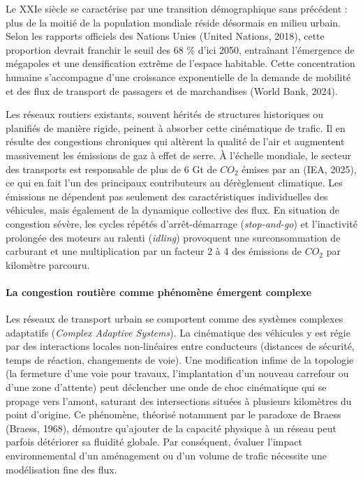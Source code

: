 \documentclass[10pt, a4paper]{article}
\begin{document}
Le XXIe siècle se caractérise par une transition démographique sans
précédent : plus de la moitié de la population mondiale réside désormais
en milieu urbain. Selon les rapports officiels des Nations Unies (United
Nations, 2018), cette proportion devrait franchir le seuil des 68 \%
d'ici 2050, entraînant l'émergence de mégapoles et une densification
extrême de l'espace habitable. Cette concentration humaine s'accompagne
d'une croissance exponentielle de la demande de mobilité et des flux de
transport de passagers et de marchandises (World Bank, 2024).

Les réseaux routiers existants, souvent hérités de structures
historiques ou planifiés de manière rigide, peinent à absorber cette
cinématique de trafic. Il en résulte des congestions chroniques qui
altèrent la qualité de l'air et augmentent massivement les émissions de
gaz à effet de serre. À l'échelle mondiale, le secteur des transports
est responsable de plus de 6 Gt de \(CO_2\) émises par an (IEA, 2025),
ce qui en fait l'un des principaux contributeurs au dérèglement
climatique. Les émissions ne dépendent pas seulement des
caractéristiques individuelles des véhicules, mais également de la
dynamique collective des flux. En situation de congestion sévère, les
cycles répétés d'arrêt-démarrage (\emph{stop-and-go}) et l'inactivité
prolongée des moteurs au ralenti (\emph{idling}) provoquent une
surconsommation de carburant et une multiplication par un facteur 2 à 4
des émissions de \(CO_2\) par kilomètre parcouru.

\paragraph{La congestion routière comme phénomène émergent
complexe}\label{la-congestion-routiuxe8re-comme-phuxe9nomuxe8ne-uxe9mergent-complexe}

Les réseaux de transport urbain se comportent comme des systèmes
complexes adaptatifs (\emph{Complex Adaptive Systems}). La cinématique
des véhicules y est régie par des interactions locales non-linéaires
entre conducteurs (distances de sécurité, temps de réaction, changements
de voie). Une modification infime de la topologie (la fermeture d'une
voie pour travaux, l'implantation d'un nouveau carrefour ou d'une zone
d'attente) peut déclencher une onde de choc cinématique qui se propage
vers l'amont, saturant des intersections situées à plusieurs kilomètres
du point d'origine. Ce phénomène, théorisé notamment par le paradoxe de
Braess (Braess, 1968), démontre qu'ajouter de la capacité physique à un
réseau peut parfois détériorer sa fluidité globale. Par conséquent,
évaluer l'impact environnemental d'un aménagement ou d'un volume de
trafic nécessite une modélisation fine des flux.
\end{document}
